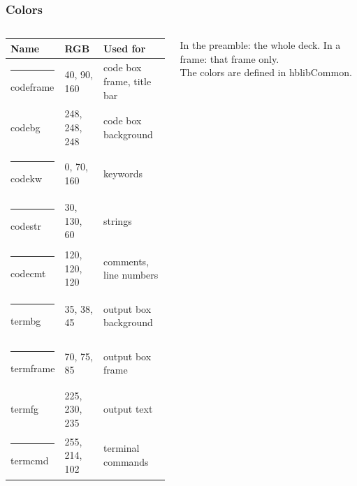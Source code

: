 \documentclass[aspectratio=169,10pt,compress]{beamer}
\begin{document}
\begin{frame}[t,fragile] \frametitle{Colors}
	\begin{columns}[T]
		\begin{column}{0.50\textwidth}

\begin{table}
		\scriptsize
		\begin{tabular}{@{}L{0.28\textwidth}L{0.22\textwidth}L{0.36\textwidth}@{}}
			\toprule
			\textbf{Name} & \textbf{RGB} & \textbf{Used for} \\
			\midrule
			\textcolor{codeframe}{\rule{6pt}{6pt}} codeframe & 40, 90, 160    & code box frame, title bar \\
			 codebg & 248, 248, 248 & code box background \\
			\textcolor{codekw}{\rule{6pt}{6pt}} codekw       & 0, 70, 160     & keywords \\
			\textcolor{codestr}{\rule{6pt}{6pt}} codestr     & 30, 130, 60    & strings \\
			\textcolor{codecmt}{\rule{6pt}{6pt}} codecmt     & 120, 120, 120  & comments, line numbers \\
			\textcolor{termbg}{\rule{6pt}{6pt}} termbg       & 35, 38, 45     & output box background \\
			\textcolor{termframe}{\rule{6pt}{6pt}} termframe & 70, 75, 85     & output box frame \\
			 termfg & 225, 230, 235  & output text \\
			\textcolor{termcmd}{\rule{6pt}{6pt}} termcmd     & 255, 214, 102  & terminal commands \\
			\bottomrule
		\end{tabular}
\end{table}%

		\end{column}
		\begin{column}{0.46\textwidth}

\begin{texcode}
\end{texcode}

			{
			}

			\footnotesize In the preamble: the whole deck. In a frame: that frame only.\\
			The colors are defined in hblibCommon.
		\end{column}
	\end{columns}
\end{frame}
\end{document}
